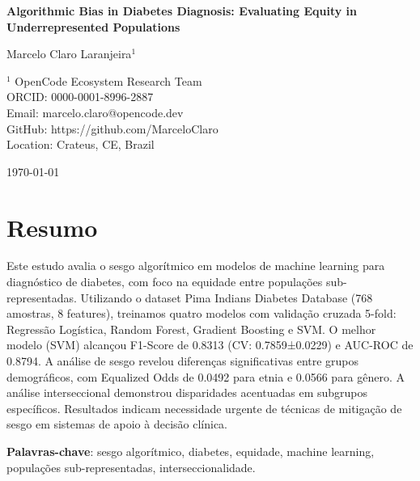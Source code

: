 \documentclass[12pt,a4paper]{article}
\begin{document}
\begin{center}
{\Large\bfseries Algorithmic Bias in Diabetes Diagnosis: 
Evaluating Equity in Underrepresented Populations\vspace{0.5cm}}

{\large Marcelo Claro Laranjeira$^{1}$\vspace{0.3cm}}

{\small $^{1}$ OpenCode Ecosystem Research Team}\\
{\small ORCID: 0000-0001-8996-2887}\\
{\small Email: marcelo.claro@opencode.dev}\\
{\small GitHub: https://github.com/MarceloClaro}\\
{\small Location: Crateus, CE, Brazil}
\vspace{0.3cm}

{\small \today}
\end{center}

\section*{Resumo}

Este estudo avalia o sesgo algorítmico em modelos de machine learning para 
diagnóstico de diabetes, com foco na equidade entre populações sub-representadas.
Utilizando o dataset Pima Indians Diabetes Database (768 amostras, 
8 features), treinamos quatro modelos com validação cruzada 5-fold: 
Regressão Logística, Random Forest, Gradient Boosting e SVM. O melhor modelo 
(SVM) alcançou F1-Score de 0.8313 (CV: 0.7859±0.0229) e AUC-ROC de 
0.8794. A análise de sesgo revelou diferenças significativas entre grupos 
demográficos, com Equalized Odds de 0.0492 para etnia e 0.0566 para gênero. 
A análise interseccional demonstrou disparidades acentuadas em subgrupos 
específicos. Resultados indicam necessidade urgente de técnicas de mitigação 
de sesgo em sistemas de apoio à decisão clínica.

\textbf{Palavras-chave}: sesgo algorítmico, diabetes, equidade, machine 
learning, populações sub-representadas, interseccionalidade.

\end{document}
